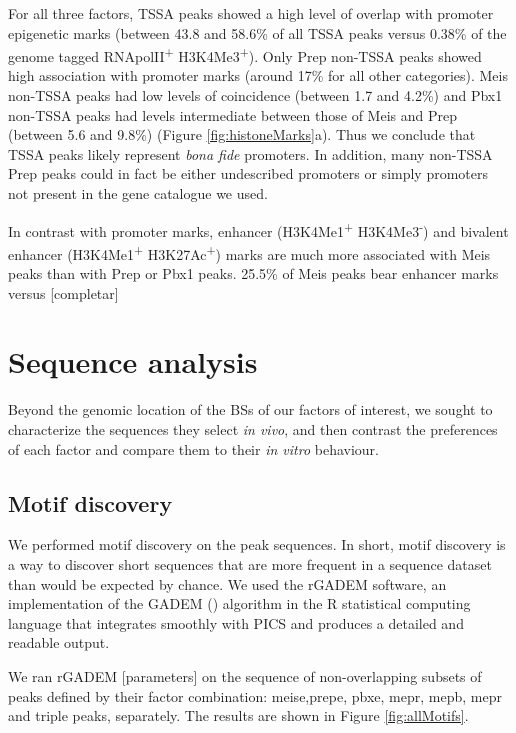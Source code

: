 For all three factors, \ac{TSSA} peaks showed a high level of overlap with promoter epigenetic marks (between 43.8 and 58.6\% of all \ac{TSSA} peaks versus 0.38\% of the genome tagged RNApolII\textsuperscript{+} H3K4Me3\textsuperscript{+}). Only Prep non-\ac{TSSA} peaks showed high association with promoter marks (around 17\% for all other categories). Meis non-\ac{TSSA} peaks had low levels of coincidence (between 1.7 and 4.2\%) and Pbx1 non-\ac{TSSA} peaks had levels intermediate between those of Meis and Prep (between 5.6 and 9.8\%) (Figure \ref{fig:histoneMarks}a). Thus we conclude that \ac{TSSA} peaks likely represent \textit{bona fide} promoters. In addition, many non-\ac{TSSA} Prep peaks could in fact be either undescribed promoters or simply promoters not present in the gene catalogue we used.

In contrast with promoter marks, enhancer (H3K4Me1\textsuperscript{+} H3K4Me3\textsuperscript{-}) and bivalent enhancer (H3K4Me1\textsuperscript{+} H3K27Ac\textsuperscript{+}) marks are much more associated with Meis peaks than with Prep or Pbx1 peaks. 25.5\% of Meis peaks bear enhancer marks versus [completar]
 
\section{Sequence analysis}

Beyond the genomic location of the \acp{BS} of our factors of interest, we sought to characterize the sequences they select \textit{in vivo}, and then contrast the preferences of each factor and compare them to their \textit{in vitro} behaviour. 

\subsection{Motif discovery}

We performed motif discovery on the peak sequences. In short, motif discovery is a way to discover short sequences that are more frequent in a sequence dataset than would be expected by chance. We used the rGADEM software, an implementation of the GADEM (\cite{Li2009a}) algorithm in the R statistical computing language that integrates smoothly with \ac{PICS} and produces a detailed and readable output.

We ran rGADEM [parameters] on the sequence of non-overlapping subsets of peaks defined by their factor combination: \ac{meise},\ac{prepe}, \ac{pbxe}, \ac{mepr}, \ac{mepb}, \ac{mepr} and triple peaks, separately. The results are shown in Figure \ref{fig:allMotifs}.

